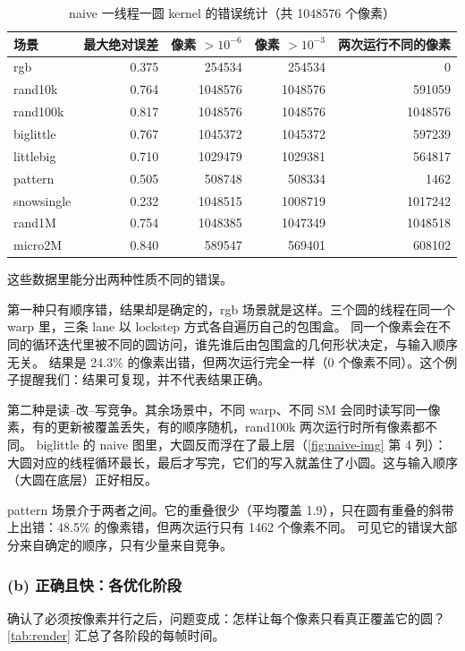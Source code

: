 \documentclass[11pt,a4paper]{ctexart}
\begin{document}
\begin{table}[H]
\centering\small
\caption{naive 一线程一圆 kernel 的错误统计（共 1048576 个像素）}\label{tab:naive}
\begin{tabular}{lrrrr}
\toprule
场景 & 最大绝对误差 & 像素 $>10^{-6}$ & 像素 $>10^{-3}$ & 两次运行不同的像素 \\
\midrule
rgb & 0.375 & 254534 & 254534 & 0 \\
rand10k & 0.764 & 1048576 & 1048576 & 591059 \\
rand100k & 0.817 & 1048576 & 1048576 & 1048576 \\
biglittle & 0.767 & 1045372 & 1045372 & 597239 \\
littlebig & 0.710 & 1029479 & 1029381 & 564817 \\
pattern & 0.505 & 508748 & 508334 & 1462 \\
snowsingle & 0.232 & 1048515 & 1008719 & 1017242 \\
rand1M & 0.754 & 1048385 & 1047349 & 1048518 \\
micro2M & 0.840 & 589547 & 569401 & 608102 \\
\bottomrule
\end{tabular}
\end{table}

这些数据里能分出两种性质不同的错误。

第一种只有顺序错，结果却是确定的，rgb 场景就是这样。三个圆的线程在同一个 warp 里，三条 lane 以 lockstep 方式各自遍历自己的包围盒。
同一个像素会在不同的循环迭代里被不同的圆访问，谁先谁后由包围盒的几何形状决定，与输入顺序无关。
结果是 24.3\% 的像素出错，但两次运行完全一样（0 个像素不同）。这个例子提醒我们：结果可复现，并不代表结果正确。

第二种是读--改--写竞争。其余场景中，不同 warp、不同 SM 会同时读写同一像素，有的更新被覆盖丢失，有的顺序随机，rand100k 两次运行时所有像素都不同。
biglittle 的 naive 图里，大圆反而浮在了最上层（\cref{fig:naive-img} 第 4 列）：大圆对应的线程循环最长，最后才写完，它们的写入就盖住了小圆。这与输入顺序（大圆在底层）正好相反。

pattern 场景介于两者之间。它的重叠很少（平均覆盖 1.9），只在圆有重叠的斜带上出错：48.5\% 的像素错，但两次运行只有 1462 个像素不同。
可见它的错误大部分来自确定的顺序，只有少量来自竞争。

\subsubsection{(b) 正确且快：各优化阶段}

确认了必须按像素并行之后，问题变成：怎样让每个像素只看真正覆盖它的圆？\cref{tab:render} 汇总了各阶段的每帧时间。
\end{document}
